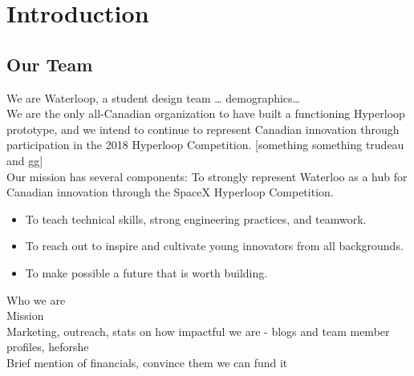 \documentclass{report}
\begin{document}
    
    \chapter{Introduction}
    
    \section{Our Team}
    We are Waterloop, a student design team … demographics…\\
    
    We are the only all-Canadian organization to have built a functioning Hyperloop prototype, and we intend to continue to represent Canadian innovation through participation in the 2018 Hyperloop Competition. [something something trudeau and gg]\\
    
    Our mission has several components:
    To strongly represent Waterloo as a hub for Canadian innovation through the SpaceX Hyperloop Competition.
    \begin{itemize}
        \item To teach technical skills, strong engineering practices, and teamwork.
        \item To reach out to inspire and cultivate young innovators from all backgrounds.
        \item To make possible a future that is worth building.
    \end{itemize}
    Who we are\\
    Mission\\
    Marketing, outreach, stats on how impactful we are - blogs and team member profiles, heforshe\\
    Brief mention of financials, convince them we can fund it
    
\end{document}
